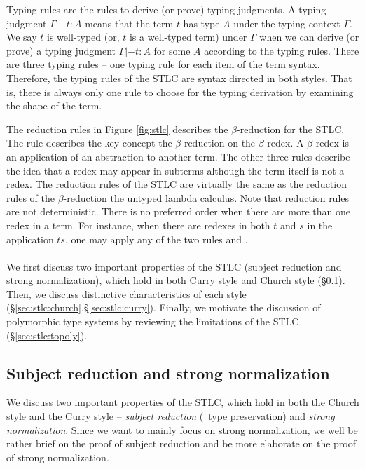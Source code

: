 Typing rules are the rules to derive (or prove) typing judgments.
A typing judgment $\Gamma |- t : A$ means that the term $t$ has type $A$
under the typing context $\Gamma$. We say $t$ is well-typed
(or, $t$ is a well-typed term) under $\Gamma$ when we can derive (or prove)
a typing judgment $\Gamma |- t : A$ for some $A$ according to the typing rules.
There are three typing rules --
one typing rule for each item of the term syntax.
Therefore, the typing rules of the STLC are syntax directed in both styles.
That is, there is always only one rule to choose for the typing derivation
by examining the shape of the term.
 
The reduction rules in Figure \ref{fig:stlc} describes the $\beta$-reduction
for the STLC. The  rule describes the key concept
the $\beta$-reduction on the $\beta$-redex. A $\beta$-redex is an application
of an abstraction to another term. The other three rules describe the idea
that a redex may appear in subterms although the term itself is not a redex.
The reduction rules of the STLC are virtually the same as the reduction rules
of the $\beta$-reduction the untyped lambda calculus. Note that reduction rules
are not deterministic. There is no preferred order when there are more than one
redex in a term. For instance, when there are redexes in both $t$ and $s$
in the application $t s$, one may apply any of the two rules 
and .

\paragraph{}
We first discuss two important properties of the STLC
(subject reduction and strong normalization), which hold
in both Curry style and Church style (\S\ref{sec:stlc:srsn}).
Then, we discuss distinctive characteristics of each style
(\S\ref{sec:stlc:church},\S\ref{sec:stlc:curry}).
Finally, we motivate the discussion of polymorphic type systems
by reviewing the limitations of the STLC (\S\ref{sec:stlc:topoly}).

\subsection{Subject reduction and strong normalization}\label{sec:stlc:srsn}
We discuss two important properties of the STLC, which hold in both
the Church style and the Curry style -- \emph{subject reduction} (\aka\
type preservation) and \emph{strong normalization}. Since we want to mainly
focus on strong normalization, we well be rather brief on the proof of
subject reduction and be more elaborate on the proof of strong normalization.
 
